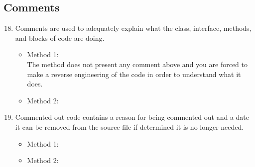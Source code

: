 \subsection{Comments}
\begin{enumerate}
\setcounter{enumi}{17}
	\item  Comments are used to adequately explain what the class, interface, methods, and blocks
	of code are doing.
		\begin{itemize}
		 	\item Method 1: \xmark\\
		 	The method does not present any comment above and you are forced to make a reverse engineering of the code in order to understand what it does.
	 		\item Method 2: 
		\end{itemize}
	\item Commented out code contains a reason for being commented out and a date it can be removed from the source file if determined it is no longer needed.
		\begin{itemize}
		 	\item Method 1: \cmark
	 		\item Method 2: 
		\end{itemize}
\end{enumerate}